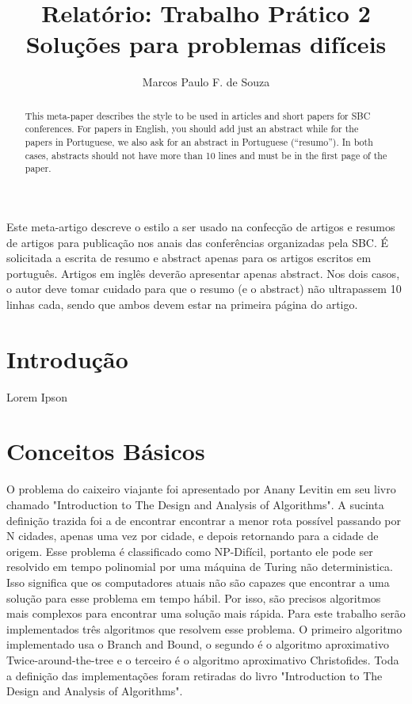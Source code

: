 \documentclass[12pt]{article}
\title{Relatório: Trabalho Prático 2\\ Soluções para problemas difíceis}
\author{ Marcos Paulo F. de Souza\inst{1} }
\begin{document}
 

\maketitle

\begin{abstract}
  This meta-paper describes the style to be used in articles and short papers
  for SBC conferences. For papers in English, you should add just an abstract
  while for the papers in Portuguese, we also ask for an abstract in
  Portuguese (``resumo''). In both cases, abstracts should not have more than
  10 lines and must be in the first page of the paper.
\end{abstract}
     
\begin{resumo} 
  Este meta-artigo descreve o estilo a ser usado na confecção de artigos e
  resumos de artigos para publicação nos anais das conferências organizadas
  pela SBC. É solicitada a escrita de resumo e abstract apenas para os artigos
  escritos em português. Artigos em inglês deverão apresentar apenas abstract.
  Nos dois casos, o autor deve tomar cuidado para que o resumo (e o abstract)
  não ultrapassem 10 linhas cada, sendo que ambos devem estar na primeira
  página do artigo.
\end{resumo}


\section{Introdução}

Lorem Ipson

\section{Conceitos Básicos}

O problema do caixeiro viajante foi apresentado por Anany Levitin em seu livro chamado "Introduction to The Design and Analysis of Algorithms". A sucinta definição trazida foi a de encontrar encontrar a menor rota possível passando por N cidades, apenas uma vez por cidade, e depois retornando para a cidade de origem. Esse problema é classificado como  NP-Difícil, portanto ele pode ser resolvido em tempo polinomial por uma máquina de Turing não deterministica. Isso significa que os computadores atuais não são capazes que encontrar a uma solução para esse problema em tempo hábil. Por isso, são precisos algoritmos mais complexos para encontrar uma solução mais rápida. Para este trabalho serão implementados três algoritmos que resolvem esse problema. O primeiro algoritmo implementado usa o Branch and Bound, o segundo é o algoritmo aproximativo Twice-around-the-tree e o terceiro é o algoritmo aproximativo Christofides. Toda a definição das implementações foram retiradas do livro "Introduction to The Design and Analysis of Algorithms".
\end{document}
